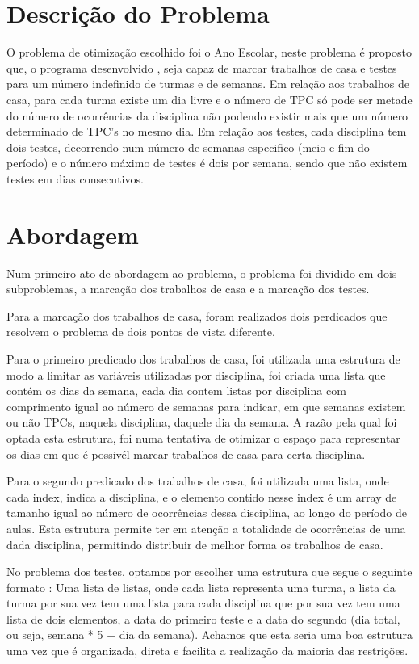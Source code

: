 \documentclass{llncs}
\begin{document}
\section{Descrição do Problema}
%
O problema de otimização escolhido foi o Ano Escolar, neste problema é proposto que, o programa desenvolvido , seja capaz de marcar trabalhos de casa e testes para um número indefinido de turmas e de semanas. Em relação aos trabalhos de casa, para cada turma existe um dia livre e o número de TPC só pode ser metade do número de ocorrências da disciplina não podendo existir mais que um número determinado de TPC's no mesmo dia. Em relação aos testes, cada disciplina tem dois testes, decorrendo num número de semanas especifico (meio e fim do período) e o número máximo de testes é dois por semana, sendo que não existem testes em dias consecutivos.

\section{Abordagem}
%
Num primeiro ato de abordagem ao problema, o problema foi dividido em dois subproblemas, a marcação dos trabalhos de casa e a marcação dos testes.

Para a marcação dos trabalhos de casa, foram realizados dois perdicados que resolvem o problema de dois pontos de vista diferente.

Para o primeiro predicado dos trabalhos de casa, foi utilizada uma estrutura de modo a limitar as variáveis utilizadas por disciplina, foi criada uma lista que contém os dias da semana, cada dia contem listas por disciplina com comprimento igual ao número de semanas para indicar, em que semanas existem ou não TPCs, naquela disciplina, daquele dia da semana. A razão pela qual foi optada esta  estrutura, foi numa tentativa de otimizar o espaço para representar os dias em que é possivél marcar trabalhos de casa para certa disciplina.
\newline

Para o segundo predicado dos trabalhos de casa, foi utilizada uma lista, onde cada index, indica a disciplina, e o elemento contido nesse index é um array de tamanho igual ao número de ocorrências dessa disciplina, ao longo do período de aulas. Esta estrutura permite ter em atenção a totalidade de ocorrências de uma dada disciplina, permitindo distribuir de melhor forma os trabalhos de casa.

No problema dos testes, optamos  por escolher uma estrutura que segue o seguinte formato : Uma lista de listas, onde cada lista representa uma turma, a lista da turma por sua vez tem uma lista para cada disciplina que por sua vez tem uma lista de dois elementos, a data do primeiro teste e a data do segundo (dia total, ou seja, semana * 5 + dia da semana). Achamos que esta seria uma boa estrutura uma vez que é organizada, direta e facilita a realização da maioria das restrições.
\end{document}
